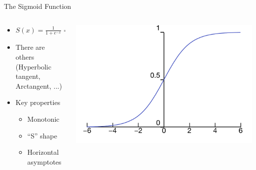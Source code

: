 \documentclass[aspectratio=169]{beamer}
\begin{document}
\begin{frame}{The Sigmoid Function}

\begin{columns}
\begin{column}{0.5\textwidth}
\begin{itemize}
\item $S(x) = \frac{1}{1+e^{-x}} = \frac{e^x}{e^x + 1}$
\item There are others (Hyperbolic tangent, Arctangent, ...)
\item Key properties
\begin{itemize}
\item Monotonic
\item ``S'' shape
\item Horizontal asymptotes
\end{itemize}
\end{itemize}
\end{column}
\begin{column}{0.5\textwidth}
\includegraphics[width=1\textwidth]{lectSVM/Logistic-curve.pdf}
\end{column}
\end{columns}
\end{frame}
\end{document}
